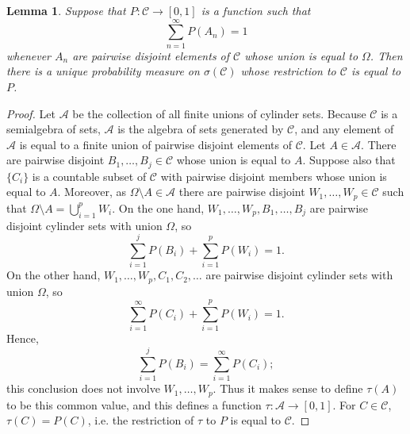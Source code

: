 \documentclass{article}
\newtheorem{lemma}[theorem]{Lemma}
\theoremstyle{definition}
\begin{document}
\begin{lemma}
Suppose that $P:\mathscr{C} \to [0,1]$ is a function such that 
\[
\sum_{n=1}^\infty P(A_n)=1
\]
whenever $A_n$ are pairwise disjoint elements of $\mathscr{C}$ whose union is equal to $\Omega$. Then there is a unique probability measure
on $\sigma(\mathscr{C})$ whose restriction to $\mathscr{C}$ is equal to $P$. 
\label{cylinderextension}
\end{lemma}
\begin{proof}
Let $\mathscr{A}$ be the collection of all finite unions of cylinder sets. Because $\mathscr{C}$ is a semialgebra of sets, $\mathscr{A}$ is the algebra of sets generated
by $\mathscr{C}$, and any element of $\mathscr{A}$ is equal to a finite union of pairwise disjoint elements of $\mathscr{C}$. 
Let $A \in \mathscr{A}$.
There are pairwise disjoint $B_1,\ldots,B_j \in \mathscr{C}$ whose union is equal to $A$. Suppose also that
$\{C_i\}$ is a countable subset of  $\mathscr{C}$ with pairwise disjoint members whose union is equal to $A$.
Moreover, as $\Omega \setminus A \in \mathscr{A}$ there are pairwise disjoint $W_1,\ldots,W_p \in \mathscr{C}$ such that
$\Omega \setminus A = \bigcup_{i=1}^p W_i$.
On the one hand, $W_1,\ldots,W_p,B_1,\ldots,B_j$ are pairwise disjoint cylinder sets with union $\Omega$, so
\[
\sum_{i=1}^j P(B_i) + \sum_{i=1}^p P(W_i)=1.
\]
On the other hand, $W_1,\ldots,W_p,C_1,C_2,\ldots$ are pairwise disjoint cylinder sets with union $\Omega$, so
\[
\sum_{i=1}^\infty P(C_i) + \sum_{i=1}^p P(W_i)=1.
\]
Hence,
\[
\sum_{i=1}^j P(B_i) = \sum_{i=1}^\infty P(C_i);
\]
this conclusion does not involve $W_1,\ldots,W_p$. Thus it makes sense to define $\tau(A)$ to be this common value,
and this defines a function
$\tau:\mathscr{A} \to [0,1]$. For $C \in \mathscr{C}$, $\tau(C)=P(C)$, i.e. the restriction of $\tau$ to $P$ is equal to $\mathscr{C}$. 


\end{proof}
\end{document}
